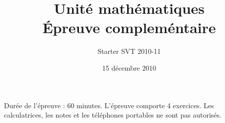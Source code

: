 




\title{Unité mathématiques \\ Épreuve compleméntaire}
\author{Starter SVT 2010-11}
\date{15 décembre 2010}



\maketitle




Durée de l'épreuve : 60 minutes. L'épreuve comporte 4 exercices. Les calculatrices, les notes et les téléphones portables ne sont pas autorisés.

\vspace{1cm}











{}





